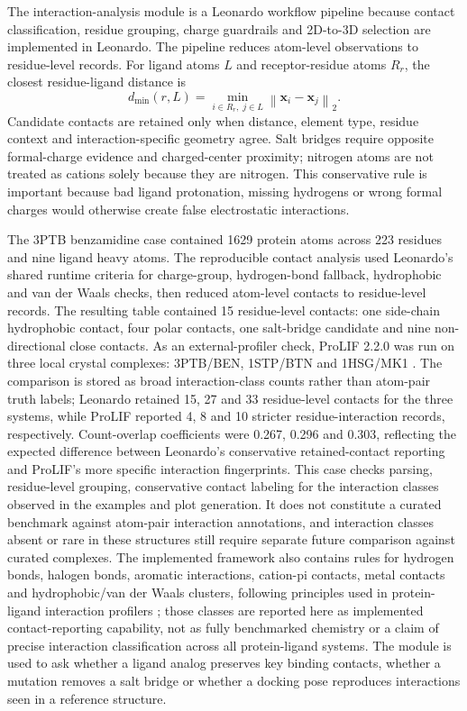 \documentclass[pdflatex,sn-vancouver-num]{sn-jnl}
\begin{document}
The interaction-analysis module is a Leonardo workflow pipeline because contact classification, residue grouping, charge guardrails and 2D-to-3D selection are implemented in Leonardo.  The pipeline reduces atom-level observations to residue-level records.  For ligand atoms $L$ and receptor-residue atoms $R_r$, the closest residue-ligand distance is
\begin{equation}
d_{\min}(r,L)=\min_{i \in R_r,\; j \in L} \left\| \mathbf{x}_i-\mathbf{x}_j \right\|_2 .
\end{equation}
Candidate contacts are retained only when distance, element type, residue context and interaction-specific geometry agree.  Salt bridges require opposite formal-charge evidence and charged-center proximity; nitrogen atoms are not treated as cations solely because they are nitrogen.  This conservative rule is important because bad ligand protonation, missing hydrogens or wrong formal charges would otherwise create false electrostatic interactions.

The 3PTB benzamidine case contained 1629 protein atoms across 223 residues and nine ligand heavy atoms.  The reproducible contact analysis used Leonardo's shared runtime criteria for charge-group, hydrogen-bond fallback, hydrophobic and van der Waals checks, then reduced atom-level contacts to residue-level records.  The resulting table contained 15 residue-level contacts: one side-chain hydrophobic contact, four polar contacts, one salt-bridge candidate and nine non-directional close contacts.  As an external-profiler check, ProLIF 2.2.0 was run on three local crystal complexes: 3PTB/BEN, 1STP/BTN and 1HSG/MK1 \cite{prolif2021}.  The comparison is stored as broad interaction-class counts rather than atom-pair truth labels; Leonardo retained 15, 27 and 33 residue-level contacts for the three systems, while ProLIF reported 4, 8 and 10 stricter residue-interaction records, respectively.  Count-overlap coefficients were 0.267, 0.296 and 0.303, reflecting the expected difference between Leonardo's conservative retained-contact reporting and ProLIF's more specific interaction fingerprints.  This case checks parsing, residue-level grouping, conservative contact labeling for the interaction classes observed in the examples and plot generation.  It does not constitute a curated benchmark against atom-pair interaction annotations, and interaction classes absent or rare in these structures still require separate future comparison against curated complexes.  The implemented framework also contains rules for hydrogen bonds, halogen bonds, aromatic interactions, cation-pi contacts, metal contacts and hydrophobic/van der Waals clusters, following principles used in protein-ligand interaction profilers \cite{plip2015,prolif2021}; those classes are reported here as implemented contact-reporting capability, not as fully benchmarked chemistry or a claim of precise interaction classification across all protein-ligand systems.  The module is used to ask whether a ligand analog preserves key binding contacts, whether a mutation removes a salt bridge or whether a docking pose reproduces interactions seen in a reference structure.
\end{document}

